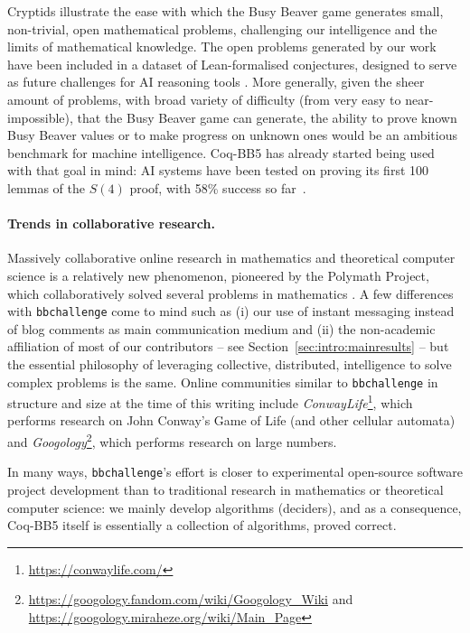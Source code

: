 \documentclass[a4paper,british]{article}
\theoremstyle{definition} %
\numberwithin{equation}{section}
\theoremstyle{definition} %
\newcommand{\CoqBB}{Coq-BB5\xspace}
\begin{document}
Cryptids illustrate the ease with which the Busy Beaver game generates small, non-trivial, open mathematical problems, challenging our intelligence and the limits of mathematical knowledge. The open problems generated by our work have been included in a dataset of Lean-formalised conjectures, designed to serve as future challenges for AI reasoning tools \cite{google-deepmind-formal-conjectures}. More generally, given the sheer amount of problems, with broad variety of difficulty (from very easy to near-impossible), that the Busy Beaver game can generate, the ability to prove known Busy Beaver values or to make progress on unknown ones would be an ambitious benchmark for machine intelligence. \CoqBB has already started being used with that goal in mind: AI systems have been tested on proving its first 100 lemmas of the $S(4)$ proof, with 58\% success so far~\cite{teodorescu2024nlir}.

\paragraph{Trends in collaborative research.} Massively collaborative online research in mathematics and theoretical computer science is a relatively new phenomenon, pioneered by the Polymath Project, which collaboratively solved several problems in mathematics \cite{Gowers2009}. A few differences with \texttt{bbchallenge} come to mind such as (i) our use of instant messaging instead of blog comments as main communication medium and (ii) the non-academic affiliation of most of our contributors -- see Section~\ref{sec:intro:mainresults} -- but the essential philosophy of leveraging collective, distributed, intelligence to solve complex problems is the same. Online communities similar to \texttt{bbchallenge} in structure and size at the time of this writing include \textit{ConwayLife}\footnote{\url{https://conwaylife.com/}}, which performs research on John Conway's Game of Life (and other cellular automata) and \textit{Googology}\footnote{\url{https://googology.fandom.com/wiki/Googology_Wiki} and \url{https://googology.miraheze.org/wiki/Main_Page}}, which performs research on large numbers.

In many ways, \texttt{bbchallenge}'s effort is closer to experimental open-source software project development than to traditional research in mathematics or theoretical computer science: we mainly develop algorithms (deciders), and as a consequence, \CoqBB itself is essentially a collection of algorithms, proved correct.
\end{document}
